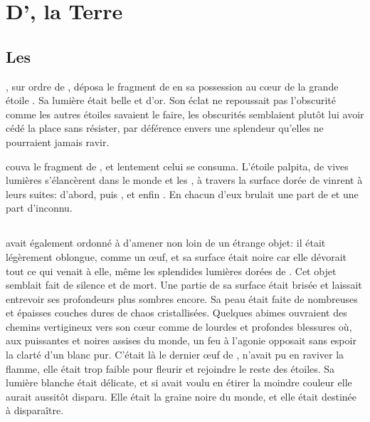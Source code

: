 \chapter{D'\Orba, la Terre}

\section{Les \Ea}

\Carac, sur ordre de \Cind, déposa le fragment de \Drisst en sa possession au cœur de la grande étoile \Naos. Sa lumière était belle et d'or. Son éclat ne repoussait pas l'obscurité comme les autres étoiles savaient le faire, les obscurités semblaient plutôt lui avoir cédé la place sans résister, par déférence envers une splendeur qu'elles ne pourraient jamais ravir. 

\Naos couva le fragment de \Drisst, et lentement celui se consuma. L'étoile palpita, de vives lumières s'élancèrent dans le monde et les \Ea, à travers la surface dorée de \Naos vinrent à leurs suites: \Oros d'abord, puis \Fercor, et enfin \Nio. En chacun d'eux brulait une part de \Mey et une part d'inconnu.

\section{\Orba}

\Cind avait également ordonné à \Carac d'amener non loin de \Naos un étrange objet: il était légèrement oblongue, comme un œuf, et sa surface était noire car elle dévorait tout ce qui venait à elle, même les splendides lumières dorées de \Naos. Cet objet semblait fait de silence et de mort. Une partie de sa surface était brisée et laissait entrevoir ses profondeurs plus sombres encore. Sa peau était faite de nombreuses et épaisses couches dures de chaos cristallisées. %
Quelques abimes ouvraient des chemins vertigineux vers son cœur comme de lourdes et profondes blessures où, aux puissantes et noires assises du monde, un feu à l'agonie opposait sans espoir la clarté d'un blanc pur. C'était là le dernier œuf de \Tot, \Carac n'avait pu en raviver la flamme, elle était trop faible pour fleurir et rejoindre le reste des étoiles. Sa lumière blanche était délicate, et si \Carac avait voulu en étirer la moindre couleur elle aurait aussitôt disparu. Elle était la graine noire du monde, et elle était destinée à disparaître.

